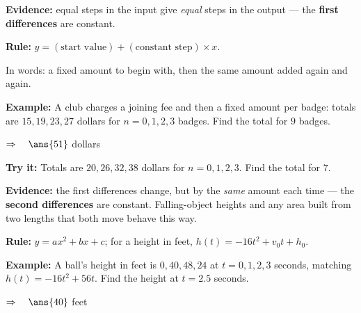\documentclass[12pt]{article}
\begin{document}


\begin{formulabox}
\textbf{Evidence:} equal steps in the input give \emph{equal} steps in the output --- the \textbf{first differences} are constant.\par
\textbf{Rule:} $y = (\text{start value}) + (\text{constant step}) \times x$.\par
In words: a fixed amount to begin with, then the same amount added again and again.
\end{formulabox}

\begin{examplebox}
\textbf{Example:} \quad A club charges a joining fee and then a fixed amount per badge: totals are $15, 19, 23, 27$ dollars for $n = 0, 1, 2, 3$ badges. Find the total for $9$ badges.

$\Rightarrow\quad \ans{51}$ dollars
\end{examplebox}

\begin{tryitbox}
\textbf{Try it:} \quad Totals are $20, 26, 32, 38$ dollars for $n = 0, 1, 2, 3$. Find the total for $7$.\\[2pt]
\end{tryitbox}


\begin{formulabox}
\textbf{Evidence:} the first differences change, but by the \emph{same} amount each time --- the \textbf{second differences} are constant. Falling-object heights and any area built from two lengths that both move behave this way.\par
\textbf{Rule:} $y = ax^2 + bx + c$; for a height in feet, $h(t) = -16t^2 + v_0 t + h_0$.
\end{formulabox}

\begin{examplebox}
\textbf{Example:} \quad A ball's height in feet is $0, 40, 48, 24$ at $t = 0, 1, 2, 3$ seconds, matching $h(t) = -16t^2 + 56t$. Find the height at $t = 2.5$ seconds.

$\Rightarrow\quad \ans{40}$ feet
\end{examplebox}
\end{document}
